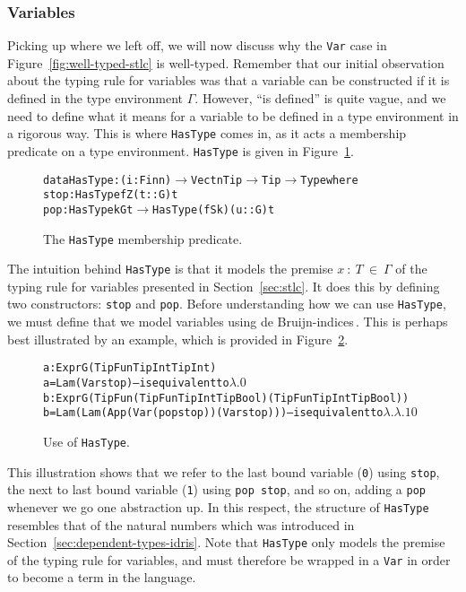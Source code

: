 \subsubsection{Variables}
Picking up where we left off, we will now discuss why the \texttt{Var} case in Figure~\ref{fig:well-typed-stlc} is well-typed. Remember that our initial observation about the typing rule for variables was that a variable can be constructed if it is defined in the type environment $\Gamma$. However, ``is defined'' is quite vague, and we need to define what it means for a variable to be defined in a type environment in a rigorous way. This is where \texttt{HasType} comes in, as it acts a membership predicate on a type environment. \texttt{HasType} is given in Figure~\ref{fig:HasType}.

\begin{figure}
\begin{alltt}
  data HasType : (i : Fin n) \(\to\) Vect n Tip \(\to\) Tip \(\to\) Type where
    stop : HasType fZ (t :: G) t
    pop  : HasType k G t \(\to\) HasType (fS k) (u :: G) t
\end{alltt}
\caption{The \texttt{HasType} membership predicate.}
\label{fig:HasType}
\end{figure}

The intuition behind \texttt{HasType} is that it models the premise $x~:~T~\in~\Gamma$ of the typing rule for variables presented in Section~\ref{sec:stlc}. It does this by defining two constructors: \texttt{stop} and \texttt{pop}. Before understanding how we can use \texttt{HasType}, we must define that we model variables using de Bruijn-indices\,\cite{Bruijn72lambdacalculus}. This is perhaps best illustrated by an example, which is provided in Figure~\ref{fig:HasType-use}. 

\begin{figure}
\begin{alltt}
  a : Expr G (TipFun TipInt TipInt)
  a = Lam (Var stop)                              -- is equivalent to \(\lambda.0\)
  b : Expr G (TipFun (TipFun TipInt TipBool) (TipFun TipInt TipBool))
  b = Lam (Lam (App (Var (pop stop)) (Var stop))) -- is equivalent to \(\lambda.\lambda.1 0\)
\end{alltt}
\caption{Use of \texttt{HasType}.}
\label{fig:HasType-use}
\end{figure}

This illustration shows that we refer to the last bound variable (\texttt{0}) using \texttt{stop}, the next to last bound variable (\texttt{1}) using \texttt{pop stop}, and so on, adding a \texttt{pop} whenever we go one abstraction up. In this respect, the structure of \texttt{HasType} resembles that of the natural numbers which was introduced in Section~\ref{sec:dependent-types-idris}. Note that \texttt{HasType} only models the premise of the typing rule for variables, and must therefore be wrapped in a \texttt{Var} in order to become a term in the language.

